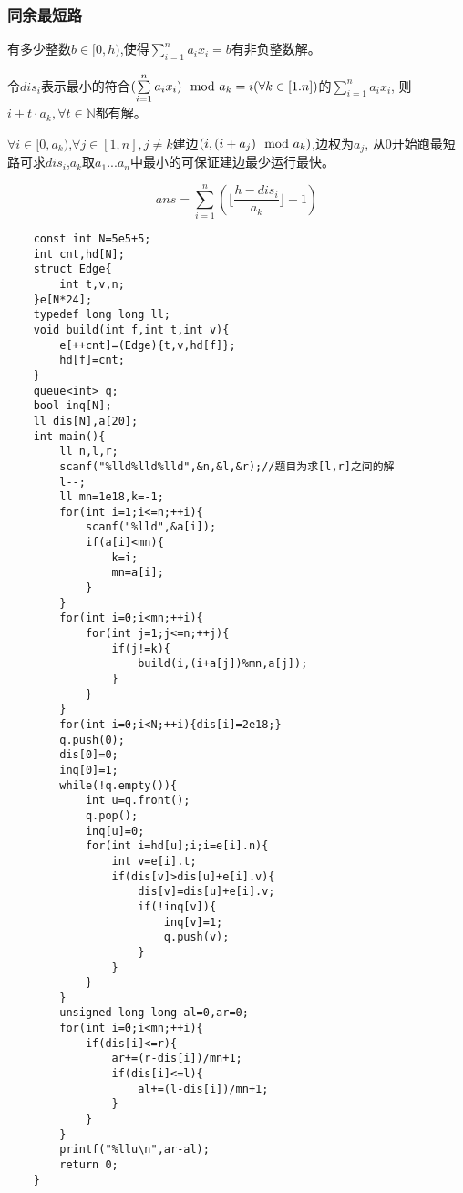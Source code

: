 \documentclass[UTF8]{ctexart}
\begin{document}
\subsubsection{同余最短路}

有多少整数$b\in [0,h)$,使得$\sum\limits_{i=1}^{n}a_ix_i=b$有非负整数解。


令$dis_i$表示最小的符合$(\sum\limits_{i=1}^{n}a_ix_i)\space \mod\space a_k=i(\forall k  \in[1.n])$的$\sum\limits_{i=1}^{n}a_ix_i$, 则$i+t\cdot a_k,\forall t \in \mathbb{N}$都有解。

$\forall i \in [0,a_k)$,$\forall j\in[1,n],j\neq k$建边$(i,(i+a_j)\mod\space a_k)$,边权为$a_j$, 从0开始跑最短路可求$dis_i$,$a_k$取$a_1...a_n$中最小的可保证建边最少运行最快。

$$
ans=\sum\limits_{i=1}^{n}(\lfloor\frac{h-dis_i}{a_k}\rfloor+1)
$$

\begin{lstlisting}
    const int N=5e5+5;
    int cnt,hd[N];
    struct Edge{
        int t,v,n;
    }e[N*24];
    typedef long long ll;
    void build(int f,int t,int v){
        e[++cnt]=(Edge){t,v,hd[f]};
        hd[f]=cnt;
    }
    queue<int> q;
    bool inq[N];
    ll dis[N],a[20];
    int main(){
        ll n,l,r;
        scanf("%lld%lld%lld",&n,&l,&r);//题目为求[l,r]之间的解
        l--;
        ll mn=1e18,k=-1;
        for(int i=1;i<=n;++i){
            scanf("%lld",&a[i]);
            if(a[i]<mn){
                k=i;
                mn=a[i];
            }
        }
        for(int i=0;i<mn;++i){
            for(int j=1;j<=n;++j){
                if(j!=k){
                    build(i,(i+a[j])%mn,a[j]);
                }
            }
        }
        for(int i=0;i<N;++i){dis[i]=2e18;}
        q.push(0);
        dis[0]=0;
        inq[0]=1;
        while(!q.empty()){
            int u=q.front();
            q.pop();
            inq[u]=0;
            for(int i=hd[u];i;i=e[i].n){
                int v=e[i].t;
                if(dis[v]>dis[u]+e[i].v){
                    dis[v]=dis[u]+e[i].v;
                    if(!inq[v]){
                        inq[v]=1;
                        q.push(v);
                    }
                }
            }
        }
        unsigned long long al=0,ar=0;
        for(int i=0;i<mn;++i){
            if(dis[i]<=r){
                ar+=(r-dis[i])/mn+1;
                if(dis[i]<=l){
                    al+=(l-dis[i])/mn+1;
                }
            }
        }
        printf("%llu\n",ar-al);
        return 0;
    }   
\end{lstlisting}
\end{document}
